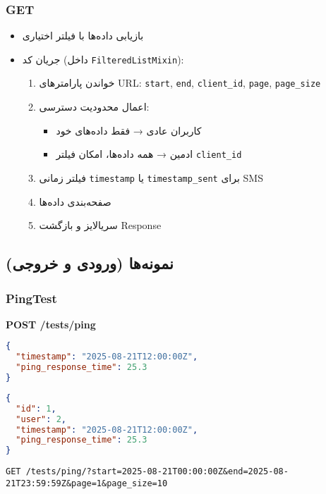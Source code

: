 \documentclass{report}
\begin{document}
\subsubsection{GET}
\begin{itemize}
    \item بازیابی داده‌ها با فیلتر اختیاری
    \item جریان کد (داخل \texttt{FilteredListMixin}):
    \begin{enumerate}
        \item خواندن پارامترهای URL: \texttt{start}, \texttt{end}, \texttt{client\_id}, \texttt{page}, \texttt{page\_size}
        \item اعمال محدودیت دسترسی:
        \begin{itemize}
            \item کاربران عادی → فقط داده‌های خود
            \item ادمین → همه داده‌ها، امکان فیلتر \texttt{client\_id}
        \end{itemize}
        \item فیلتر زمانی \texttt{timestamp} یا \texttt{timestamp\_sent} برای SMS
        \item صفحه‌بندی داده‌ها
        \item سریالایز و بازگشت Response
    \end{enumerate}
\end{itemize}

\subsection{نمونه‌ها (ورودی و خروجی)}

\subsubsection{PingTest}
\textbf{POST /tests/ping}
\begin{lstlisting}[language=json]
{
  "timestamp": "2025-08-21T12:00:00Z",
  "ping_response_time": 25.3
}
\end{lstlisting}

\begin{lstlisting}[language=json]
{
  "id": 1,
  "user": 2,
  "timestamp": "2025-08-21T12:00:00Z",
  "ping_response_time": 25.3
}
\end{lstlisting}

\begin{center}
	\begin{latin}
		\texttt{GET \hspace{1cm} /tests/ping/?start=2025-08-21T00:00:00Z\&end=2025-08-21T23:59:59Z\&page=1\&page\_size=10}
	\end{latin}
\end{center}
\end{document}
